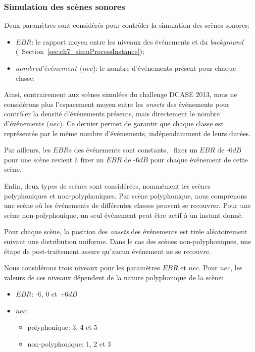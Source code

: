 \subsubsection{Simulation des scènes sonores}
\label{sec:ch7_simulationDcase2016}

Deux paramètres sont considérés pour contrôler la simulation des scènes sonores:

\begin{itemize}
\item $EBR$: le rapport moyen entre les niveaux des événements et du \emph{background} (\cf~Section~\ref{sec:ch7_simuProcessInstance});
\item $nombre d'événement$ ($nec$): le nombre d'événements présent pour chaque classe;
\end{itemize}

Ainsi, contrairement aux scènes simulées du challenge DCASE 2013, nous ne considérons plus l'espacement moyen entre les \emph{onsets} des événements pour contrôler la densité d'événements présents, mais directement le nombre d'événements ($nec$). Ce dernier permet de garantir que chaque classe est représentée par le même nombre d'événements, indépendamment de leurs durées. 

Par ailleurs, les $EBRs$ des événements sont constants, \ie~fixer un $EBR$ de -6$dB$ pour une scène revient à fixer un $EBR$ de -6$dB$ pour chaque événement de cette scène.

Enfin, deux types de scènes sont considérées, nommément les scènes polyphoniques et non-polyphoniques. Par scène polyphonique, nous comprenons une scène où les événements de différentes classes peuvent se recouvrer. Pour une scène non-polyphonique, un seul événement peut être actif à un instant donné.

Pour chaque scène, la position des \emph{onsets} des événements est tirée aléatoirement suivant une distribution uniforme. Dans le cas des scènes non-polyphoniques, une étape de post-traitement assure qu'aucun événement ne se recouvre.

Nous considérons trois niveaux pour les paramètres $EBR$ et $nec$. Pour $nec$, les valeurs de ces niveaux dépendent de la nature polyphonique de la scène:

\begin{itemize}
\item $EBR$: -6, 0 et +6$dB$
\item $nec$: 
\begin{itemize}
\item polyphonique: 3, 4 et 5
\item non-polyphonique: 1, 2 et 3
\end{itemize}
\end{itemize}

